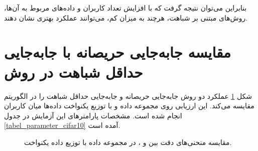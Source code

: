 بنابراین می‌توان نتیجه گرفت که با افزایش تعداد کاربران و داده‌های مربوط به آن‌ها، روش‌های مبتنی بر شباهت، هرچند به میزان کم، می‌توانند عملکرد بهتری نشان دهند.




\section{
	مقایسه جابه‌جایی حریصانه با جابه‌جایی حداقل شباهت در روش
}

شکل
\ref{result_MSS_vs_GS_cifar10}
عملکرد دو روش جابه‌جایی حریصانه و جابه‌جایی حداقل شباهت را در الگوریتم
مقایسه می‌کند. این ارزیابی روی مجموعه داده
و با توزیع یکنواخت داده‌ها میان کاربران انجام شده است. مشخصات پارامترهای این آزمایش در جدول
\ref{tabel_parameter_cifar10}
آمده است.


\begin{figure}[t]
	\centering
	\hspace{0.8mm}
	\caption{
		مقایسه منحنی‌های دقت بین
		و
		، در مجموعه داده
		با توزیع داده یکنواخت.
	}
	\label{result_MSS_vs_GS_cifar10}
\end{figure}


